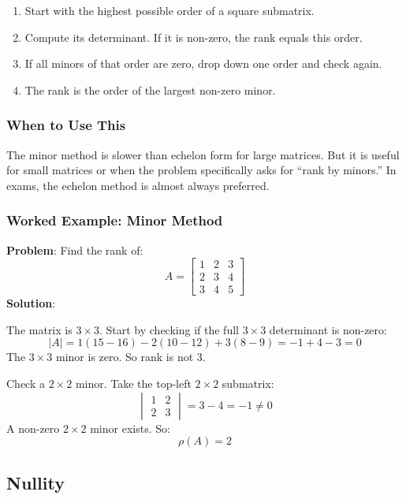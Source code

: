 \documentclass[
]{article}
\providecommand{\tightlist}{%
  \setlength{\itemsep}{0pt}\setlength{\parskip}{0pt}}
\begin{document}
\begin{enumerate}
\def\labelenumi{\arabic{enumi}.}
\tightlist
\item
  Start with the highest possible order of a square submatrix.
\item
  Compute its determinant. If it is non-zero, the rank equals this
  order.
\item
  If all minors of that order are zero, drop down one order and check
  again.
\item
  The rank is the order of the largest non-zero minor.
\end{enumerate}

\subsubsection{When to Use This}\label{when-to-use-this}

The minor method is slower than echelon form for large matrices. But it
is useful for small matrices or when the problem specifically asks for
``rank by minors.'' In exams, the echelon method is almost always
preferred.

\subsubsection{Worked Example: Minor
Method}\label{worked-example-minor-method}

\textbf{Problem}: Find the rank of:
\[
A =
\begin{bmatrix}
1 & 2 & 3 \\
2 & 3 & 4 \\
3 & 4 & 5
\end{bmatrix}
\]
\textbf{Solution}:

The matrix is \(3 \times 3\). Start by checking if the full
\(3 \times 3\) determinant is non-zero:
\[
|A| = 1(15 - 16) - 2(10 - 12) + 3(8 - 9) = -1 + 4 - 3 = 0
\]
The \(3 \times 3\) minor is zero. So rank is not 3.

Check a \(2 \times 2\) minor. Take the top-left \(2 \times 2\)
submatrix:
\[
\begin{vmatrix}
1 & 2 \\
2 & 3
\end{vmatrix} = 3 - 4 = -1 \neq 0
\]
A non-zero \(2 \times 2\) minor exists. So:
\[
\rho(A) = 2
\]

\subsection{Nullity}\label{nullity}
\end{document}
